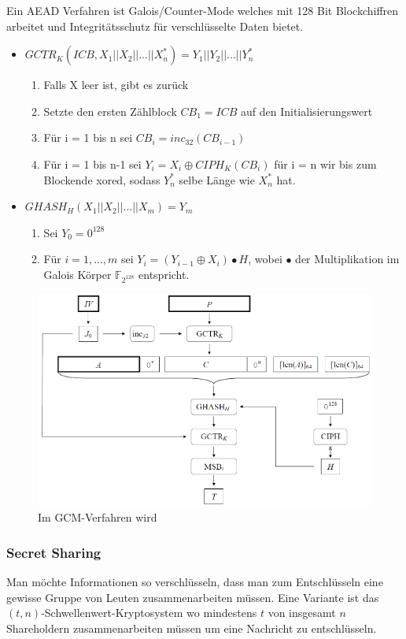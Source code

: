 \documentclass[a4paper,12pt,leqno]{article}
\begin{document}
Ein AEAD Verfahren ist Galois/Counter-Mode welches mit 128 Bit Blockchiffren arbeitet und Integritätsschutz für verschlüsselte Daten bietet.\\
\begin{itemize}
\item $GCTR_K(ICB,X_1||X_2||...||X_n^*)=Y_1||Y_2||...||Y_n^*$
	\begin{enumerate}
	\item Falls X leer ist, gibt es zurück
	\item Setzte den ersten Zählblock $CB_1=ICB$ auf den Initialisierungswert
	\item Für i = 1 bis n sei $CB_i= inc_{32}(CB_{i-1})$
	\item Für i = 1 bis n-1 sei $Y_i=X_i\oplus CIPH_K(CB_i)$ für i = n wir bis zum Blockende xored, sodass $Y_n^*$ selbe Länge wie $X_n^*$ hat.
	\end{enumerate}
\item $GHASH_H(X_1||X_2||...||X_m)=Y_m$
	\begin{enumerate}
	\item Sei $Y_0=0^{128}$
	\item Für $i=1,...,m$ sei $Y_i=(Y_{i-1}\oplus X_i)\bullet H$, wobei $\bullet$ der Multiplikation im Galois Körper $\mathbb{F}_{2^{128}}$ entspricht.
	\end{enumerate}
\end{itemize}
\begin{figure}
\centering
\includegraphics[scale=0.9]{Grafiken/GCMArchitektur.png}
\caption{Im GCM-Verfahren wird}
\end{figure}

\subsubsection{Secret Sharing}
Man möchte Informationen so verschlüsseln, dass man zum Entschlüsseln eine gewisse Gruppe von Leuten zusammenarbeiten müssen. Eine Variante ist das $(t,n)$-Schwellenwert-Kryptosystem wo mindestens $t$ von insgesamt $n$ Shareholdern zusammenarbeiten müssen um eine Nachricht zu entschlüsseln.\\
\end{document}
